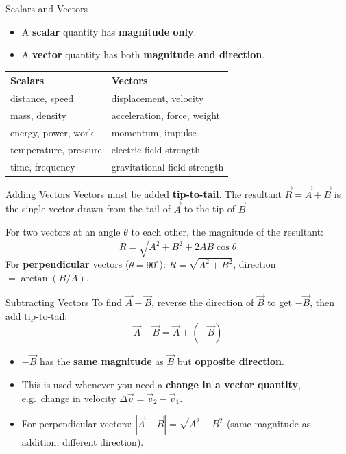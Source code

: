 \begin{definitionbox}{Scalars and Vectors}
\begin{itemize}[itemsep=4pt]
  \item A \textbf{scalar} quantity has \textbf{magnitude only}.
  \item A \textbf{vector} quantity has both \textbf{magnitude and direction}.
\end{itemize}
\begin{center}
\renewcommand{\arraystretch}{1.4}
\begin{tabular}{@{} l l @{}}
\toprule
\textbf{Scalars} & \textbf{Vectors} \\
\midrule
distance, speed & displacement, velocity \\
mass, density & acceleration, force, weight \\
energy, power, work & momentum, impulse \\
temperature, pressure & electric field strength \\
time, frequency & gravitational field strength \\
\bottomrule
\end{tabular}
\end{center}
\end{definitionbox}

\begin{formulabox}{Adding Vectors}
Vectors must be added \textbf{tip-to-tail}. The resultant $\vec{R} = \vec{A} + \vec{B}$ is the single vector drawn from the tail of $\vec{A}$ to the tip of $\vec{B}$.

For two vectors at an angle $\theta$ to each other, the magnitude of the resultant:
$$R = \sqrt{A^2 + B^2 + 2AB\cos\theta}$$
For \textbf{perpendicular} vectors ($\theta = 90^\circ$): $R = \sqrt{A^2 + B^2}$, direction $= \arctan(B/A)$.
\end{formulabox}

\begin{formulabox}{Subtracting Vectors}
To find $\vec{A} - \vec{B}$, reverse the direction of $\vec{B}$ to get $-\vec{B}$, then add tip-to-tail:
$$\vec{A} - \vec{B} = \vec{A} + (-\vec{B})$$
\begin{itemize}[itemsep=2pt]
  \item $-\vec{B}$ has the \textbf{same magnitude} as $\vec{B}$ but \textbf{opposite direction}.
  \item This is used whenever you need a \textbf{change in a vector quantity}, e.g.\ change in velocity $\Delta\vec{v} = \vec{v}_2 - \vec{v}_1$.
  \item For perpendicular vectors: $|\vec{A} - \vec{B}| = \sqrt{A^2 + B^2}$ (same magnitude as addition, different direction).
\end{itemize}
\end{formulabox}

